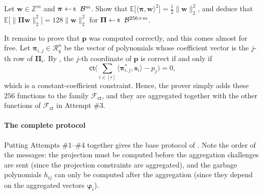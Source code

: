 \documentclass[../../book.tex]{subfiles}
\begin{document}
\begin{exercise}\label{exercise:labrador-jl-mean}
    Let $\mathbf{w} \in \mathbb{Z}^m$ and $\boldsymbol{\pi} \leftarrowS \mathcal{B}^m$. Show that $\mathbb{E}\big[\langle \boldsymbol{\pi}, \mathbf{w} \rangle^2\big] = \frac{1}{2}\|\mathbf{w}\|_2^2$, and deduce that $\mathbb{E}\big[\|\boldsymbol{\Pi}\mathbf{w}\|_2^2\big] = 128\|\mathbf{w}\|_2^2$ for $\boldsymbol{\Pi} \leftarrowS \mathcal{B}^{256 \times m}$.
\end{exercise}

It remains to prove that $\mathbf{p}$ was computed correctly, and this comes almost for free.
Let $\boldsymbol{\pi}_{i,j} \in \mathcal{R}_q^n$ be the vector of polynomials whose coefficient vector is the $j$-th row of $\boldsymbol{\Pi}_i$.
By , the $j$-th coordinate of $\mathbf{p}$ is correct if and only if
\begin{equation*}
    \mathsf{ct}\Big(\sum_{i \in [r]} \big\langle \boldsymbol{\pi}_{i,j}^{\ast}, \mathbf{s}_i \big\rangle - p_j\Big) = 0,
\end{equation*}
which is a constant-coefficient constraint.
Hence, the prover simply adds these $256$ functions to the family $\mathcal{F}_{\mathsf{ct}}$, and they are aggregated together with the other functions of $\mathcal{F}_{\mathsf{ct}}$ in Attempt \#3.

\paragraph{The complete protocol}
Putting Attempts \#1--\#4 together gives the base protocol of .
Note the order of the messages: the projection must be computed before the aggregation challenges are sent (since the projection constraints are aggregated), and the garbage polynomials $h_{ij}$ can only be computed after the aggregation (since they depend on the aggregated vectors $\boldsymbol{\varphi}_i$).
\end{document}
